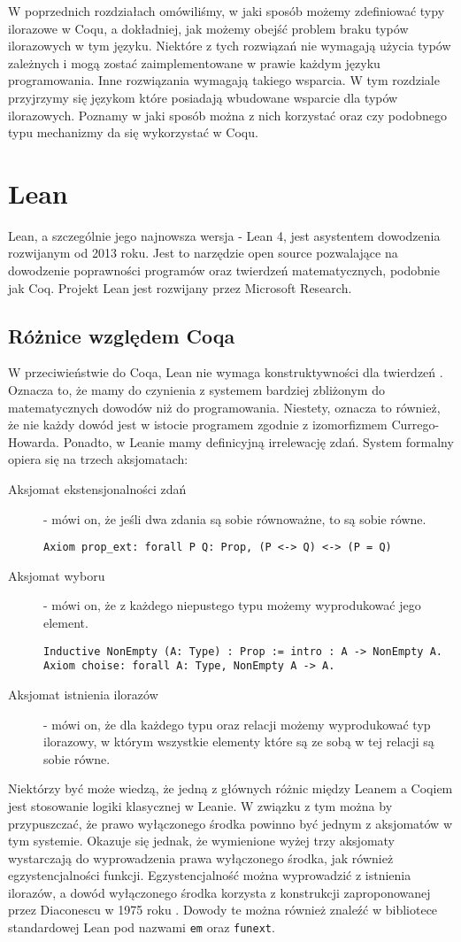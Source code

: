 W poprzednich rozdziałach omówiliśmy, w jaki sposób możemy zdefiniować typy ilorazowe w Coqu, a dokładniej, jak możemy obejść problem braku typów ilorazowych w tym języku. Niektóre z tych rozwiązań nie wymagają użycia typów zależnych i mogą zostać zaimplementowane w prawie każdym języku programowania. Inne rozwiązania wymagają takiego wsparcia. W tym rozdziale przyjrzymy się językom które posiadają wbudowane wsparcie dla typów ilorazowych. Poznamy w jaki sposób można z nich korzystać oraz czy podobnego typu mechanizmy da się wykorzystać w Coqu.
\section{Lean}
Lean, a szczególnie jego najnowsza wersja - Lean 4, jest asystentem dowodzenia rozwijanym od 2013 roku. Jest to narzędzie open source pozwalające na dowodzenie poprawności programów oraz twierdzeń matematycznych, podobnie jak Coq. Projekt Lean jest rozwijany przez Microsoft Research.
\subsection{Różnice względem Coqa}
W przeciwieństwie do Coqa, Lean nie wymaga konstruktywności dla twierdzeń \cite{lean4}. Oznacza to, że mamy do czynienia z systemem bardziej zbliżonym do matematycznych dowodów niż do programowania. Niestety, oznacza to również, że nie każdy dowód jest w istocie programem zgodnie z izomorfizmem Currego-Howarda. Ponadto, w Leanie mamy definicyjną irrelewację zdań. System formalny opiera się na trzech aksjomatach:
\begin{description}
    \item[Aksjomat ekstensjonalności zdań] - mówi on, że jeśli dwa zdania są sobie równoważne, to są sobie równe.
    \begin{verbatim}
Axiom prop_ext: forall P Q: Prop, (P <-> Q) <-> (P = Q)
    \end{verbatim}
    \item[Aksjomat wyboru] - mówi on, że z każdego niepustego typu możemy wyprodukować jego element.
    \begin{verbatim}
Inductive NonEmpty (A: Type) : Prop := intro : A -> NonEmpty A.
Axiom choise: forall A: Type, NonEmpty A -> A.
    \end{verbatim}
    \item[Aksjomat istnienia ilorazów] - mówi on, że dla każdego typu oraz relacji możemy wyprodukować typ ilorazowy, w którym wszystkie elementy które są ze sobą w tej relacji są sobie równe.
\end{description}
Niektórzy być może wiedzą, że jedną z głównych różnic między Leanem a Coqiem jest stosowanie logiki klasycznej w Leanie. W związku z tym można by przypuszczać, że prawo wyłączonego środka powinno być jednym z aksjomatów w tym systemie. Okazuje się jednak, że wymienione wyżej trzy aksjomaty wystarczają do wyprowadzenia prawa wyłączonego środka, jak również egzystencjalności funkcji. Egzystencjalność można wyprowadzić z istnienia ilorazów, a dowód wyłączonego środka korzysta z konstrukcji zaproponowanej przez Diaconescu w 1975 roku \cite{choise}. Dowody te można również znaleźć w bibliotece standardowej Lean pod nazwami \texttt{em} oraz \texttt{funext}.
